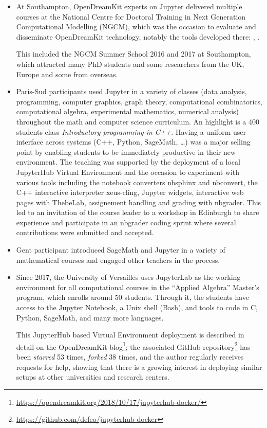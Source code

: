 \documentclass{deliverablereport}
\begin{document}
\begin{itemize}
\item At Southampton, OpenDreamKit experts on Jupyter delivered
  multiple courses at the National Centre for Doctoral Training in
  Next Generation Computational Modelling (NGCM), which was the
  occasion to evaluate and disseminate OpenDreamKit technology,
  notably the tools developed there: ,
  .

  This included the NGCM Summer School 2016 and 2017 at Southampton,
  which attracted many PhD students and some researchers from the UK,
  Europe and some from overseas.

\item Paris-Sud participants used Jupyter in a variety of classes
  (data analysis, programming, computer graphics, graph theory,
  computational combinatorics, computational algebra, experimental
  mathematics, numerical analysis) throughout the math and computer
  science curriculum. An highlight is a 400 students class
  \emph{Introductory programming in C++}. Having a uniform user
  interface across systems (C++, Python, SageMath, \ldots) was a major
  selling point by enabling students to be immediately productive in
  their new environment. The teaching was supported by the deployment
  of a local JupyterHub Virtual Environment and the occasion to
  experiment with various tools including the notebook converters
  nbsphinx and nbconvert, the C++ interactive interpreter xeus-cling,
  Jupyter widgets, interactive web pages with ThebeLab, assignement
  handling and grading with nbgrader. This led to an invitation of the
  course leader to a workshop in Edinburgh to share experience and
  participate in an nbgrader coding sprint where several
  contributions were submitted and accepted.
\item Gent participant introduced SageMath and Jupyter in a variety of
  mathematical courses and engaged other teachers in the process.

\item Since 2017, the University of Versailles uses JupyterLab as the
  working environment for all computational courses in the ``Applied
  Algebra'' Master's program, which enrolls around 50
  students. Through it, the students have access to the Jupyter
  Notebook, a Unix shell (Bash), and tools to code in C, Python,
  SageMath, and many more languages.

  This JupyterHub based Virtual Environment deployment is described in detail on
  the OpenDreamKit
  blog\footnote{\url{https://opendreamkit.org/2018/10/17/jupyterhub-docker/}};
  the associated GitHub
  repository\footnote{\url{https://github.com/defeo/jupyterhub-docker}}
  has been \emph{starred} 53 times, \emph{forked} 38 times, and the
  author regularly receives requests for help, showing that there is a
  growing interest in deploying similar setups at other universities
  and research centers.


\end{itemize}
\end{document}

